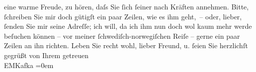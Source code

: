 \begin{ledgroupsized}[t]{13cm}
               eine warme Freude, zu hören, daſs Sie ſich ſeiner nach Kräften annehmen. Bitte,
               ſchreiben Sie mir doch gütigſt ein paar Zeilen, wie es ihm geht, – oder, lieber,
               ſenden Sie mir seine Adreſſe; ich will, da ich ihm nun doch wol kaum mehr werde
               beſuchen können – vor meiner ſchwediſch-norwegiſchen Reiſe – gerne ein paar Zeilen an
               ihn richten.\pend
           \pstart
           Leben Sie recht wohl, lieber Freund, u. ſeien Sie herzlichſt gegrüßt\pend
           \pstart
           von Ihrem getreuen{\\[\baselineskip]}\spacefill\mbox{EMKafka}\pend
           \leftskip=0em{}
         
         \endnumbering{}\end{ledgroupsized}  \newcommand{\dateiname}{L00187}\newcommand{\titel}{Eduard Michael Kafka an Arthur Schnitzler, 7. 3. 1893}\newcommand{\editorInnen}{Martin Anton Müller und Gerd-Hermann Susen}
      